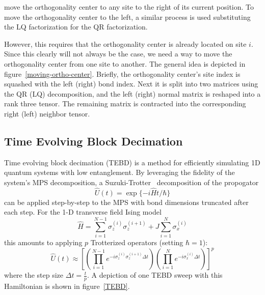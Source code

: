 \documentclass[12pt]{article}
\newenvironment{Figure}
  {\par\medskip\noindent\minipage{\linewidth}}
  {\endminipage\par\medskip}
\begin{document}
\begin{multicols}{2}
\begin{Figure}
{{		 move the orthogonality center to any site to the right of its
		 current position. To move the orthogonality center to the left,
		 a similar process is used substituting the LQ factorization for
		 the QR factorization.}}
		\label{moving-ortho-center}
	\end{Figure}
	However, this requires that the orthogonality center is already
	located on site $i$. Since this clearly will not always be the case,
	we need a way to move the orthogonality center from one site to another.
	The general idea is depicted in figure~\ref{moving-ortho-center}.
	Briefly, the orthogonality center's site index is squashed with the
	left (right) bond index. Next it is split into two matrices
	using the QR (LQ) decomposition, and the left (right) normal matrix
	is reshaped into a rank three tensor. The remaining matrix is
	contracted into the corresponding right (left) neighbor tensor.



	\subsection{Time Evolving Block Decimation}
	Time evolving block decimation (TEBD) is a method for efficiently
	simulating 1D quantum systems with low entanglement. By leveraging
	the fidelity of the system's MPS decomposition, a
	Suzuki-Trotter~\cite{suzuki}
	decomposition of the propogator
	$$\hat{U}(t)=\exp\{-i\hat{H}t/\hbar\}$$
	can be applied step-by-step to the MPS with bond dimensions truncated
	after each step. For the 1-D transverse field Ising model
	\begin{equation}
		\hat{H}=\sum_{i=1}^{N-1}\sigma_z^{(i)}\sigma_z^{(i+1)}+J\sum_{i=1}^N\sigma_x^{(i)}
		\label{ising}
	\end{equation}
	this amounts to applying $p$ Trotterized operators (setting $\hbar=1$):
	\[
		\hat{U}(t) \approx
		\left[
			\left(\prod_{i=1}^{N-1}
				e^{-i\sigma_z^{(i)}\sigma_z^{(i+1)}\Delta t}
			\right)
			\left(\prod_{i=1}^Ne^{-i\sigma_x^{(i)}\Delta t}\right)
		\right]^p
	\]
	where the step size $\Delta t=\frac{t}{p}$. A depiction of one TEBD
	sweep with this Hamiltonian is shown in figure~\ref{TEBD}.


\end{multicols}
\end{document}
